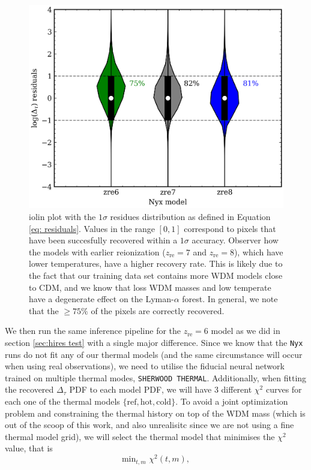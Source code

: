 \begin{figure}
    \centering
    \includegraphics[width=0.8\linewidth]{img/ML/violin_nyx.png}
    \caption{iolin plot with the $1\sigma$ residues distribution as defined in Equation \ref{eq: residuals}. Values in the range $[0,1]$ correspond to pixels that have been succesfully recovered within a $1\sigma$ accuracy. Observer how the models with earlier reionization ($z_\mathrm{re}=7$ and $z_\mathrm{re}=8$), which have lower temperatures, have a higher recovery rate. This is likely due to the fact that our training data set contains more WDM models close to CDM, and we know that loss WDM masses and low temperate have a degenerate effect on the Lyman-$\alpha$ forest. In general, we note that the $\geq 75 \%$ of the pixels are correctly recovered.}
    \label{fig: nyx violin}
\end{figure}
We then run the same inference pipeline for the $z_\mathrm{re}=6$ model as we did in section \ref{sec:hires test} with a single major difference. Since we know that the \texttt{Nyx} runs do not fit any of our thermal models (and the same circumstance will occur when using real observations), we need to utilise the fiducial neural network trained on multiple thermal modes, \texttt{SHERWOOD THERMAL}. Additionally, when fitting the recovered $\Delta_\tau$ PDF to each model PDF, we will have 3 different $\chi^2$ curves for each one of the thermal models $\{\mathrm{ref}, \mathrm{hot}, \mathrm{cold} \}$. To avoid a joint optimization problem and constraining the thermal history on top of the WDM mass (which is out of the scoop of this work, and also unrealisitc since we are not using a fine thermal model grid), we will select the thermal model that minimises the $\chi^2$ value, that is
\begin{equation}\label{eq: chi thermal def}
    \mathrm{min}_{t,m} \, \, \chi^2(t,m),
\end{equation}
